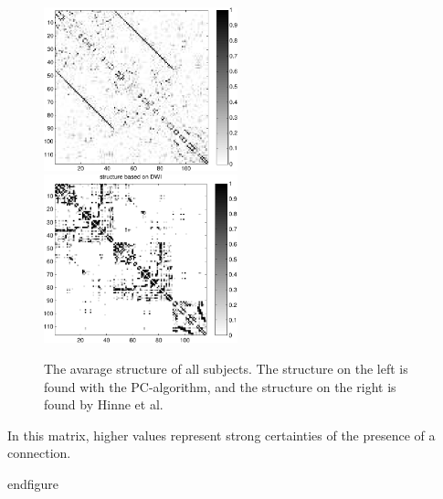 \documentclass[a4paper, 10pt, english, onecolumn]{article}
\begin{document}
\begin{figure}[h!]
  \centering
  \includegraphics[width=0.5\textwidth]{images/struct_full}
  \includegraphics[width=0.5\textwidth]{images/structure_max}
  \caption{The avarage structure of all subjects. The structure on the left is found with the PC-algorithm, and the structure on the right is found by Hinne et al.}
\label{fig:struct_avg}
\end{figure}
In this matrix, higher values represent strong certainties of the presence of a connection.

end{figure}
\end{document}
